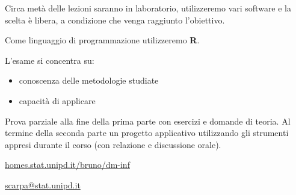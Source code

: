 Circa metà delle lezioni saranno in laboratorio, utilizzeremo vari
software e la scelta è libera, a condizione che venga raggiunto
l'obiettivo.

Come linguaggio di programmazione utilizzeremo \textbf{R}.

L'esame si concentra su:

\begin{itemize}
\item
  conoscenza delle metodologie studiate
\item
  capacità di applicare
\end{itemize}

Prova parziale alla fine della prima parte con esercizi e domande di
teoria. Al termine della seconda parte un progetto applicativo
utilizzando gli strumenti appresi durante il corso (con relazione e
discussione orale).

\url{homes.stat.unipd.it/bruno/dm-inf }


\url{scarpa@stat.unipd.it}
